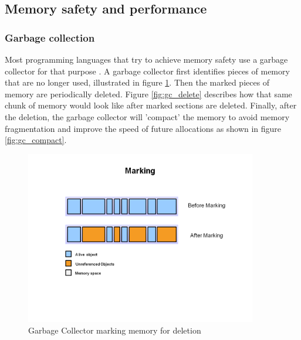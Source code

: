 \subsection{Memory safety and performance}

\subsubsection{Garbage collection}

Most programming languages that try to achieve memory safety use a garbage collector for that purpose \cite{java_garbage_collector}.
A garbage collector first identifies pieces of memory that are no longer used, illustrated in figure \ref{fig:gc_mark}.
Then the marked pieces of memory are periodically deleted. Figure \ref{fig:gc_delete} describes how that same chunk of memory would look like after marked sections are deleted.
Finally, after the deletion, the garbage collector will 'compact' the memory to avoid memory fragmentation and improve the speed of future allocations as shown in figure \ref{fig:gc_compact}.

\begin{figure}[htb]
    \centering
    \includegraphics[width=0.9\textwidth]{figures/fundamentals_garbage_collector_marking.PNG}
    \caption[Illustration: Garbage Collector marking memory for deletion \cite{java_garbage_collector}]{Garbage Collector marking memory for deletion}
    \label{fig:gc_mark}
\end{figure}

